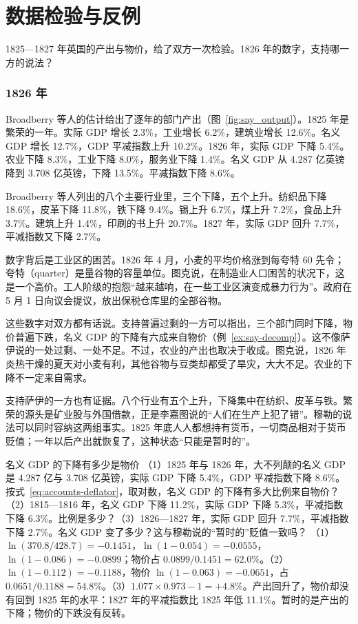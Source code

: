 \section{数据检验与反例}\label{sec:say-test}

1825—1827 年英国的产出与物价，给了双方一次检验。1826 年的数字，支持哪一方的说法？

\subsubsection{1826 年}
Broadberry 等人的估计给出了逐年的部门产出（图~\ref{fig:say_output}）\cite{broadberry2015,boe2017}。1825 年是繁荣的一年。实际 GDP 增长 2.3\%，工业增长 6.2\%，建筑业增长 12.6\%。名义 GDP 增长 12.7\%，GDP 平减指数上升 10.2\%。1826 年，实际 GDP 下降 5.4\%。农业下降 8.3\%，工业下降 8.0\%，服务业下降 1.4\%。名义 GDP 从 4.287 亿英镑降到 3.708 亿英镑，下降 13.5\%。平减指数下降 8.6\%。

Broadberry 等人列出的八个主要行业里，三个下降，五个上升。纺织品下降 18.6\%，皮革下降 11.8\%，铁下降 9.4\%。锡上升 6.7\%，煤上升 7.2\%，食品上升 3.7\%。建筑上升 1.4\%，印刷的书上升 20.7\%\cite{broadberry2015,boe2017}。1827 年，实际 GDP 回升 7.7\%，平减指数又下降 2.7\%。

数字背后是工业区的困苦。1826 年 4 月，小麦的平均价格涨到每夸特 60 先令；夸特（quarter）是量谷物的容量单位。图克说，在制造业人口困苦的状况下，这是一个高价。工人阶级的抱怨“越来越响，在一些工业区演变成暴力行为”\cite{tooke1838v2}。政府在 5 月 1 日向议会提议，放出保税仓库里的全部谷物\cite{tooke1838v2}。

这些数字对双方都有话说。支持普遍过剩的一方可以指出，三个部门同时下降，物价普遍下跌，名义 GDP 的下降有六成来自物价（例~\ref{ex:say-decomp}）。这不像萨伊说的一处过剩、一处不足。不过，农业的产出也取决于收成。图克说，1826 年炎热干燥的夏天对小麦有利，其他谷物与豆类却都受了旱灾，大大不足\cite{tooke1838v2}。农业的下降不一定来自需求。

支持萨伊的一方也有证据。八个行业有五个上升，下降集中在纺织、皮革与铁。繁荣的源头是矿业股与外国借款，正是李嘉图说的“人们在生产上犯了错”。穆勒的说法可以同时容纳这两组事实。1825 年底人人都想持有货币，一切商品相对于货币贬值；一年以后产出就恢复了，这种状态“只能是暂时的”。

\begin{example}{名义 GDP 的下降有多少是物价}\label{ex:say-decomp}
（1）1825 年与 1826 年，大不列颠的名义 GDP 是 4.287 亿与 3.708 亿英镑，实际 GDP 下降 5.4\%，GDP 平减指数下降 8.6\%。按式~\eqref{eq:accounts-deflator}，取对数，名义 GDP 的下降有多大比例来自物价？（2）1815—1816 年，名义 GDP 下降 11.2\%，实际 GDP 下降 5.3\%，平减指数下降 6.3\%。比例是多少？（3）1826—1827 年，实际 GDP 回升 7.7\%，平减指数下降 2.7\%。名义 GDP 变了多少？这与穆勒说的“暂时的”贬值一致吗？
\solution （1）$\ln(370.8/428.7)=-0.1451$，$\ln(1-0.054)=-0.0555$，$\ln(1-0.086)=-0.0899$；物价占 $0.0899/0.1451=62.0\%$。（2）$\ln(1-0.112)=-0.1188$，物价 $\ln(1-0.063)=-0.0651$，占 $0.0651/0.1188=54.8\%$。（3）$1.077\times0.973-1=+4.8\%$。产出回升了，物价却没有回到 1825 年的水平：1827 年的平减指数比 1825 年低 11.1\%。暂时的是产出的下降；物价的下跌没有反转。
\end{example}

